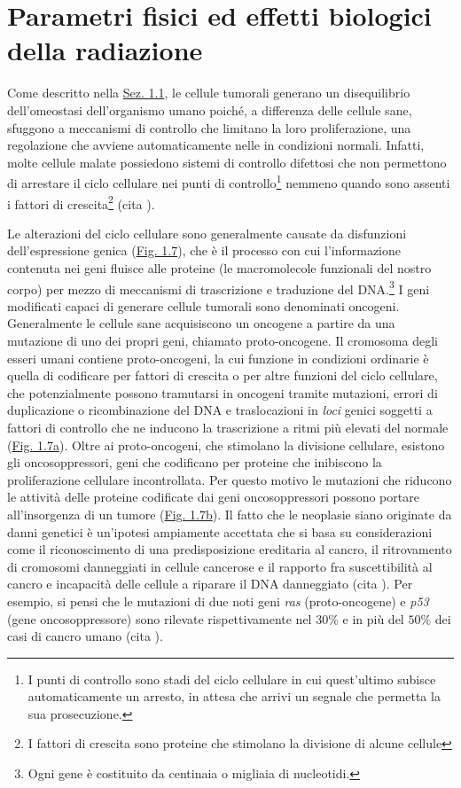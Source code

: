 \documentclass[12pt,a4paper,twoside]{report}
\begin{document}
	\section{Parametri fisici ed effetti biologici della radiazione}
	Come descritto nella \hyperref[sec:1.1]{Sez. 1.1}, le cellule tumorali generano un disequilibrio dell'omeostasi dell'organismo umano poiché, a differenza delle cellule sane, sfuggono a meccanismi di controllo che limitano la loro proliferazione, una regolazione che avviene automaticamente nelle in condizioni normali. Infatti, molte cellule malate possiedono sistemi di controllo difettosi che non permettono di arrestare il ciclo cellulare nei punti di controllo\footnote{I punti di controllo sono stadi del ciclo cellulare in cui quest'ultimo subisce automaticamente un arresto, in attesa che arrivi un segnale che permetta la sua prosecuzione.} nemmeno quando sono assenti i fattori di crescita\footnote{I fattori di crescita sono proteine che stimolano la divisione di alcune cellule} (cita
	).
	
	Le alterazioni del ciclo cellulare sono generalmente causate da disfunzioni dell'espressione genica (\hyperref[fig:mutazioni_genetiche]{Fig. 1.7}), che è il processo con cui l'informazione contenuta nei geni fluisce alle proteine (le macromolecole funzionali del nostro corpo) per mezzo di meccanismi di trascrizione e traduzione del DNA.\footnote{Ogni gene è costituito da centinaia o migliaia di nucleotidi.} I geni modificati capaci di generare cellule tumorali sono denominati oncogeni. Generalmente le cellule sane acquisiscono un oncogene a partire da una mutazione di uno dei propri geni, chiamato proto-oncogene. Il cromosoma degli esseri umani contiene proto-oncogeni, la cui funzione in condizioni ordinarie è quella di codificare per fattori di crescita o per altre funzioni del ciclo cellulare, che potenzialmente possono tramutarsi in oncogeni tramite mutazioni, errori di duplicazione o ricombinazione del DNA e traslocazioni in \textit{loci} genici soggetti a fattori di controllo che ne inducono la trascrizione a ritmi più elevati del normale (\hyperref[fig:oncogene]{Fig. 1.7a}). Oltre ai proto-oncogeni, che stimolano la divisione cellulare, esistono gli oncosoppressori, geni che codificano per proteine che inibiscono la proliferazione cellulare incontrollata. Per questo motivo le mutazioni che riducono le attività delle proteine codificate dai geni oncosoppressori possono portare all'insorgenza di un tumore (\hyperref[fig:oncosoppressore]{Fig. 1.7b}). Il fatto che le neoplasie siano originate da danni genetici è un'ipotesi ampiamente accettata che si basa su considerazioni come il riconoscimento di una predisposizione ereditaria al cancro, il ritrovamento di cromosomi danneggiati in cellule cancerose e il rapporto fra suscettibilità al cancro e incapacità delle cellule a riparare il DNA danneggiato (cita
	). Per esempio, si pensi che le mutazioni di due noti geni \textit{ras} (proto-oncogene) e \textit{p53} (gene oncosoppressore) sono rilevate rispettivamente nel $30\%$ e in più del $50\%$ dei casi di cancro umano (cita
	).
	
\end{document}
